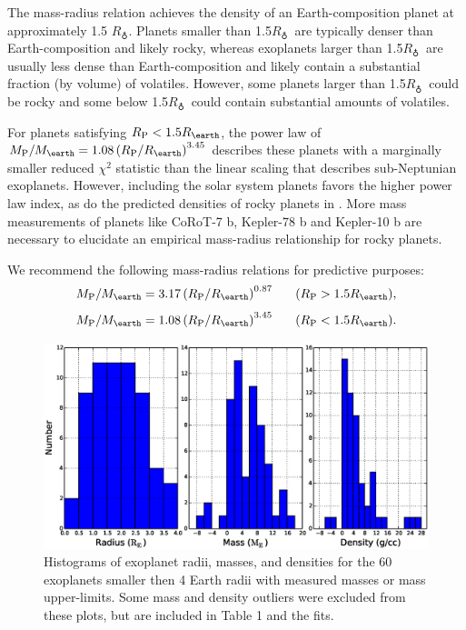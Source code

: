 \documentclass[iop]{emulateapj}
\newcommand{\rpl}{\ensuremath{R_{\rm P}}}
\newcommand{\mpl}{\ensuremath{M_{\rm P}}}
\newcommand{\rearth}{\ensuremath{R_\earth}}
\newcommand{\mearth}{\ensuremath{M_\earth}}
\begin{document}
The mass-radius relation achieves the density of an Earth-composition planet at approximately 1.5 \rearth.   Planets smaller than 1.5\rearth\ are typically denser than Earth-composition and likely rocky, whereas exoplanets larger than 1.5\rearth\ are usually less dense than Earth-composition and likely contain a substantial fraction (by volume) of volatiles.  However, some planets larger than 1.5\rearth\ could be rocky and some below 1.5\rearth\ could contain substantial amounts of volatiles.

For planets satisfying $\rpl < 1.5 \rearth$, the power law of $\mpl/\mearth = 1.08 \left(\rpl/\rearth\right)^{3.45}$ describes these planets with a marginally smaller reduced $\chi^2$ statistic than the linear scaling that describes sub-Neptunian exoplanets.  However, including the solar system planets favors the higher power law index, as do the predicted densities of rocky planets in \citet{Seager2007}.  More mass measurements of planets like CoRoT-7 b, Kepler-78 b and Kepler-10 b are necessary to elucidate an empirical mass-radius relationship for rocky planets.

We recommend the following mass-radius relations for predictive purposes:  $$\mpl/\mearth = 3.17 \left(\rpl/\rearth \right)^{0.87} ~~~~~(\rpl > 1.5\rearth),$$ $$\mpl/\mearth = 1.08 \left(\rpl/\rearth\right)^{3.45} ~~~~~(\rpl < 1.5\rearth).$$



\begin{figure}[htbp] %
   \centering
   \includegraphics[width=6in]{histograms.eps} 
   \caption{\small Histograms of exoplanet radii, masses, and densities for the 60 exoplanets smaller then 4 Earth radii with measured masses or mass upper-limits.  Some mass and density outliers were excluded from these plots, but are included in Table 1 and the fits.}
\label{fig:histograms}
\end{figure}
\end{document}
